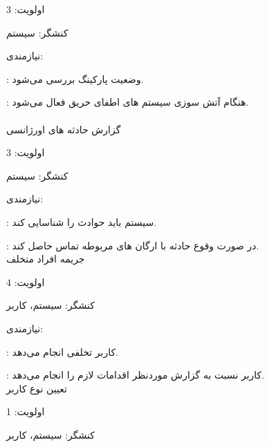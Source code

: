 \documentclass[oneside,a4paper,12pt]{book}
\begin{document}
\hspace{8 mm}	اولویت: 3

\hspace{8 mm}	کنشگر: سیستم

\hspace{8 mm}	نیازمندی: 

\hspace{16 mm}	: وضعیت پارکینگ بررسی می‌شود.

\hspace{16 mm}	: هنگام آتش سوزی سیستم های اطفای حریق فعال می‌شود.\\\\


\lr{\textbf{-}} \hspace{5 mm}  گزارش حادثه های اورژانسی

\hspace{8 mm}	اولویت: 3

\hspace{8 mm}	کنشگر: سیستم

\hspace{8 mm}	نیازمندی: 

\hspace{16 mm}	: سیستم باید حوادث را شناسایی کند.

\hspace{16 mm}	: در صورت وقوع حادثه با ارگان های مربوطه تماس حاصل کند.\\


\lr{\textbf{-}} \hspace{5 mm}  جریمه افراد متخلف

\hspace{8 mm}	اولویت: 4

\hspace{8 mm}	کنشگر: سیستم، کاربر

\hspace{8 mm}	نیازمندی: 

\hspace{16 mm}	: کاربر تخلفی انجام می‌دهد.

\hspace{16 mm}	: کاربر نسبت به گزارش موردنظر اقدامات لازم را انجام می‌دهد.\\


\lr{\textbf{-}} \hspace{5 mm}  تعیین نوع کاربر

\hspace{8 mm}	اولویت: 1

\hspace{8 mm}	کنشگر: سیستم، کاربر
\end{document}
